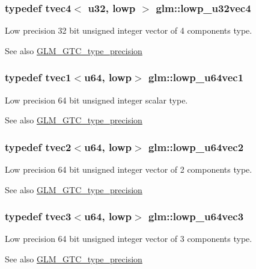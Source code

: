 \subsubsection[{lowp\+\_\+u32vec4}]{\setlength{\rightskip}{0pt plus 5cm}typedef tvec4$<$ {\bf u32}, lowp $>$ {\bf glm\+::lowp\+\_\+u32vec4}}\label{namespaceglm_ab671efbf3b747eb8422971b60c925300}
Low precision 32 bit unsigned integer vector of 4 components type. \begin{DoxySeeAlso}{See also}
\hyperlink{group__gtc__type__precision}{G\+L\+M\+\_\+\+G\+T\+C\+\_\+type\+\_\+precision} 
\end{DoxySeeAlso}
\hypertarget{namespaceglm_abb476bd46127c5148bf1d00cea62d064}{}
\subsubsection[{lowp\+\_\+u64vec1}]{\setlength{\rightskip}{0pt plus 5cm}typedef tvec1$<${\bf u64}, lowp$>$ {\bf glm\+::lowp\+\_\+u64vec1}}\label{namespaceglm_abb476bd46127c5148bf1d00cea62d064}
Low precision 64 bit unsigned integer scalar type. \begin{DoxySeeAlso}{See also}
\hyperlink{group__gtc__type__precision}{G\+L\+M\+\_\+\+G\+T\+C\+\_\+type\+\_\+precision} 
\end{DoxySeeAlso}
\hypertarget{namespaceglm_afeb976720a93f60bb03600f1880d6132}{}
\subsubsection[{lowp\+\_\+u64vec2}]{\setlength{\rightskip}{0pt plus 5cm}typedef tvec2$<${\bf u64}, lowp$>$ {\bf glm\+::lowp\+\_\+u64vec2}}\label{namespaceglm_afeb976720a93f60bb03600f1880d6132}
Low precision 64 bit unsigned integer vector of 2 components type. \begin{DoxySeeAlso}{See also}
\hyperlink{group__gtc__type__precision}{G\+L\+M\+\_\+\+G\+T\+C\+\_\+type\+\_\+precision} 
\end{DoxySeeAlso}
\hypertarget{namespaceglm_aab88e6c0a19cd02475818032deae529d}{}
\subsubsection[{lowp\+\_\+u64vec3}]{\setlength{\rightskip}{0pt plus 5cm}typedef tvec3$<${\bf u64}, lowp$>$ {\bf glm\+::lowp\+\_\+u64vec3}}\label{namespaceglm_aab88e6c0a19cd02475818032deae529d}
Low precision 64 bit unsigned integer vector of 3 components type. \begin{DoxySeeAlso}{See also}
\hyperlink{group__gtc__type__precision}{G\+L\+M\+\_\+\+G\+T\+C\+\_\+type\+\_\+precision} 
\end{DoxySeeAlso}
\hypertarget{namespaceglm_a065789a607d0dedd298461844a57949a}{}
